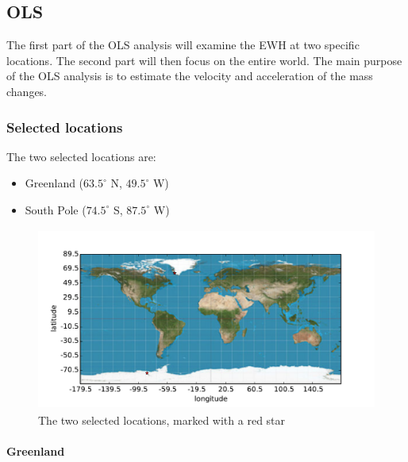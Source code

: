 \subsection{OLS}

The first part of the OLS analysis will examine the EWH at two specific locations. The second part will then focus on the entire world. The main purpose of the OLS analysis is to estimate the velocity and acceleration of the mass changes.

\subsubsection{Selected locations}

The two selected locations are:
\begin{itemize}
\item Greenland ($63.5^\circ$ N, $49.5^\circ$ W)
\item South Pole ($74.5^\circ$ S, $87.5^\circ$ W)
\end{itemize}
\begin{figure}[H]
	\centering
	\includegraphics[height=6cm]{figures/ols-selected-map}
	\caption{The two selected locations, marked with a red star}
\end{figure}

\paragraph{Greenland}

